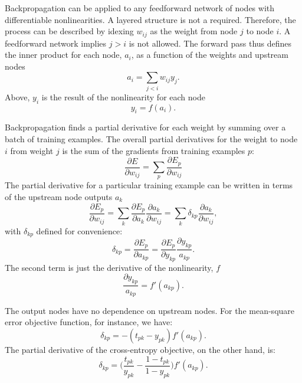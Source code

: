 Backpropagation can be applied to any feedforward network of nodes with differentiable nonlinearities.  A layered structure is not a required.
Therefore, the process can be described by idexing $w_{ij}$ as the weight from node $j$ to node $i$.
A feedforward network implies $j>i$ is not allowed.  The forward pass thus defines the inner product for each node, $a_i$, as a function of the weights and upstream nodes
\begin{equation}
a_i = \sum_{j<i} w_{ij} y_j.
\end{equation}
Above, $y_i$ is the result of the nonlinearity for each node
\begin{equation}
y_i = f(a_i).
\end{equation}

Backpropagation finds a partial derivative for each weight by summing over a batch of training examples.  The overall partial derivatives for the weight to node $i$ from weight $j$ is the sum of the gradients from training examples $p$:
\begin{equation}
\frac{\partial E}{\partial w_{ij}} = \sum_p \frac{\partial E_p}{\partial w_{ij}}
\end{equation}
The partial derivative for a particular training example can be written in terms of the upstream node outputs $a_k$
\begin{equation}
\frac{\partial E_p}{\partial w_{ij}} =
\sum_k \frac{\partial E_p}{\partial a_k} \frac{\partial a_k}{\partial w_{ij}} =
\sum_k \delta_{kp} \frac{\partial a_k}{\partial w_{ij}},
\end{equation}
with $\delta_{kp}$ defined for convenience:
\begin{equation}
\delta_{kp} = \frac{\partial E_p}{\partial a_{kp}} = \frac{\partial E_p}{\partial y_{kp}}\frac{\partial y_{kp}}{a_{kp}}.
\end{equation}
The second term is just the derivative of the nonlinearity, $f$
\begin{equation}
\frac{\partial y_{kp}}{a_{kp}} = f'(a_{kp}).
\end{equation}

The output nodes have no dependence on upstream nodes.  For the mean-square
error objective function, for instance, we have:
\begin{equation}
\delta_{kp} = -(t_{pk} - y_{pk})f'(a_{kp}).
\end{equation}
The partial derivative of the cross-entropy objective, on the other hand, is:
\begin{equation}
\delta_{kp} = \bigg(\frac{t_{pk}}{y_{pk}}- \frac{1-t_{pk}}{1-y_{pk}}\bigg)f'(a_{kp}).
\end{equation}

